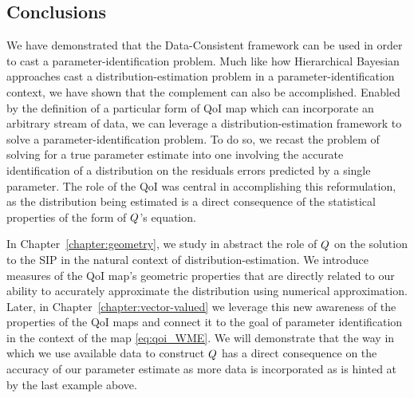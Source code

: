 

\subsection{Conclusions}\label{sec:conclusions}
We have demonstrated that the Data-Consistent framework can be used in order to cast a parameter-identification problem.
Much like how Hierarchical Bayesian approaches cast a distribution-estimation problem in a parameter-identification context, we have shown that the complement can also be accomplished.
Enabled by the definition of a particular form of QoI map which can incorporate an arbitrary stream of data, we can leverage a distribution-estimation framework to solve a parameter-identification problem.
To do so, we recast the problem of solving for a true parameter estimate into one involving the accurate identification of a distribution on the residuals errors predicted by a single parameter.
The role of the QoI was central in accomplishing this reformulation, as the distribution being estimated is a direct consequence of the statistical properties of the form of $Q$'s equation.

In Chapter~\ref{chapter:geometry}, we study in abstract the role of $Q$ on the solution to the SIP in the natural context of distribution-estimation.
We introduce measures of the QoI map's geometric properties that are directly related to our ability to accurately approximate the distribution using numerical approximation.
Later, in Chapter~\ref{chapter:vector-valued} we leverage this new awareness of the properties of the QoI maps and connect it to the goal of parameter identification in the context of the map \eqref{eq:qoi_WME}.
We will demonstrate that the way in which we use available data to construct $Q$ has a direct consequence on the accuracy of our parameter estimate as more data is incorporated as is hinted at by the last example above.
